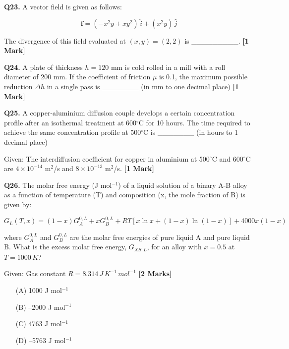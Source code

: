 \documentclass[11pt]{article}
\newcommand{\questiona}[2]{
    \noindent\textbf{Q#2.} #1 \hfill \textbf{[1 Mark]}
}
\newcommand{\questionb}[2]{
    \noindent\textbf{Q#2.} #1 \hfill \textbf{[2 Marks]}
}
\begin{document}
\questiona{A vector field is given as follows:  

\[
\mathbf{f} = (-x^2 y + x y^2)\,\hat{i} + (x^2 y)\,\hat{j}
\]

The divergence of this field evaluated at \((x, y) = (2, 2)\) is \_\_\_\_\_\_\_\_\_.}{23}
\vspace{0.5cm}

\questiona{A plate of thickness \(h = 120\) mm is cold rolled in a mill with a roll diameter of 200 mm. If the coefficient of friction \(\mu\) is 0.1, the maximum possible reduction \(\Delta h\) in a single pass is \_\_\_\_\_\_\_ (in mm to one decimal place)}{24}
\vspace{0.5cm}

\questiona{A copper-aluminium diffusion couple develops a certain concentration profile after an isothermal treatment at 600\(^\circ\)C for 10 hours. The time required to achieve the same concentration profile at 500\(^\circ\)C is \_\_\_\_\_\_\_ (in hours to 1 decimal place)

Given: The interdiffusion coefficient for copper in aluminium at 500\(^\circ\)C and 600\(^\circ\)C are \(4 \times 10^{-14}\) m\(^2\)/s and \(8 \times 10^{-13}\) m\(^2\)/s.}{25}
\vspace{0.5cm}

\questionb{The molar free energy (J mol\(^{-1}\)) of a liquid solution of a binary A-B alloy as a function of temperature (T) and composition (x, the mole fraction of B) is given by:

\[
G_L(T, x) = (1 - x)G_A^{0,L} + xG_B^{0,L} + RT[x \ln x + (1 - x) \ln(1 - x)] + 4000x(1 - x)
\]

where \(G_A^{0,L}\) and \(G_B^{0,L}\) are the molar free energies of pure liquid A and pure liquid B. What is the excess molar free energy, \(G_{XS,L}\), for an alloy with \(x = 0.5\) at \(T = 1000\,K\)?  

Given: Gas constant \(R = 8.314\, J\, K^{-1}\, mol^{-1}\)}{26}
\begin{enumerate}
    \item[(A)] 1000 J mol\(^{-1}\)  
    \item[(B)] –2000 J mol\(^{-1}\)  
    \item[(C)] 4763 J mol\(^{-1}\)  
    \item[(D)] –5763 J mol\(^{-1}\)  
\end{enumerate}
\vspace{0.5cm}
\end{document}
